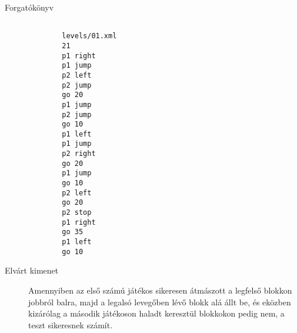 \begin{description}
	\item[Forgatókönyv]
	\begin{verbatim}

		levels/01.xml
		21
		p1 right
		p1 jump
		p2 left
		p2 jump
		go 20
		p1 jump
		p2 jump
		go 10
		p1 left
		p1 jump
		p2 right
		go 20
		p1 jump
		go 10
		p2 left
		go 20
		p2 stop
		p1 right
		go 35
		p1 left
		go 10
	\end{verbatim}
	
	\item[Elvárt kimenet] Amennyiben az első számú játékos sikeresen átmászott a legfelső blokkon jobbról balra, majd a legalsó levegőben lévő blokk alá állt be, és eközben kizárólag a második játékoson haladt keresztül blokkokon pedig nem, a teszt sikeresnek számít.
	
\end{description}

\newpage


